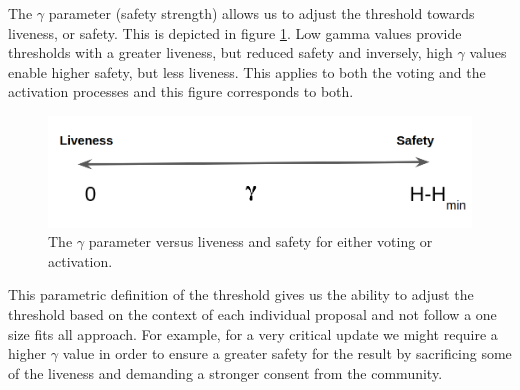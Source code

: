 %

The $\gamma$ parameter (safety strength) allows us to adjust the threshold 
towards liveness, or 
safety. This is depicted in figure \ref{fig:gamma_parameter}. Low gamma values 
provide thresholds with a greater liveness, but reduced safety and inversely, 
high $\gamma$ values enable higher safety, but less liveness. This applies to 
both the voting and the activation processes and this figure corresponds to 
both.

\begin{figure}[h!] %
	\centering
	\includegraphics[width=0.6\columnwidth,
	keepaspectratio]{figures/gamma.png}
	\caption{The $\gamma$ parameter versus liveness and safety for either 
	voting or activation.}
	\label{fig:gamma_parameter}
\end{figure}

This parametric definition of the threshold gives us the ability to adjust the 
threshold based on the context of each individual proposal and not follow a one 
size fits all approach. For example, for a very critical update we might 
require a higher $\gamma$ value in order to ensure a greater safety for the 
result by sacrificing some of the liveness and demanding a stronger consent 
from the community. 

